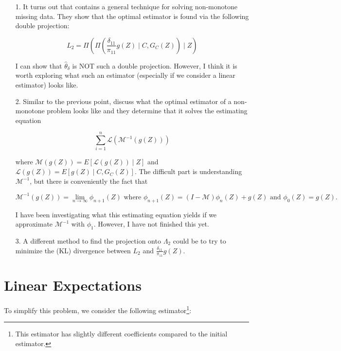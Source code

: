 \documentclass[12pt]{article}
\begin{document}
\begin{itemize}
  \item[1.] It turns out that \cite{tsiatis2006semiparametric} contains 
    a general technique for solving non-monotone missing data. They show 
    that the optimal estimator is found via the following double projection:

    \[L_2 = \Pi\left(\Pi\left(\frac{\delta_{11}}{\pi_{11}}g(Z) \mid C,
    G_C(Z)\right) \mid Z\right)\]

    I can show that $\hat \theta_\delta$ is NOT such a double projection. 
    However, I think it is worth exploring what such an estimator (especially 
    if we consider a linear estimator) looks like.
  \item[2.] Similar to the previous point, \cite{tsiatis2006semiparametric} 
    discuss what the optimal estimator of a non-monotone problem looks like 
    and they determine that it solves the estimating equation

    \[\sum_{i = 1}^n \mathcal{L}(\mathcal{M}^{-1}(g(Z)))\]

    where $\mathcal{M}(g(Z)) = E[\mathcal{L}(g(Z)) \mid Z]$ and 
    $\mathcal{L}(g(Z)) = E[g(Z) \mid C, G_C(Z)]$. The difficult part is 
    understanding $\mathcal{M}^{-1}$, but there is conveniently the fact that

    \[\mathcal{M}^{-1}(g(Z)) = \lim_{n \to \infty} \phi_{n + 1}(Z) \text{ where } 
      \phi_{n + 1}(Z) = (I - \mathcal{M}) \phi_n(Z) + g(Z) \text{ and }
    \phi_0(Z) = g(Z).\]

    I have been investigating what this estimating equation yields if we 
    approximate $\mathcal{M}^{-1}$ with $\phi_1$. However, I have not 
    finished this yet.
  \item[3.] A different method to find the projection onto $\Lambda_2$ 
    could be to try to minimize the (KL) divergence between 
    $L_2$ and $\frac{\delta_{11}}{\pi_{11}}g(Z)$.
\end{itemize}

\newpage 

\printbibliography

\newpage

\appendix

\section{Linear Expectations}

To simplify this problem, we consider the following estimator\footnote{This
estimator has slightly different coefficients compared to the initial
estimator.}:
\end{document}
